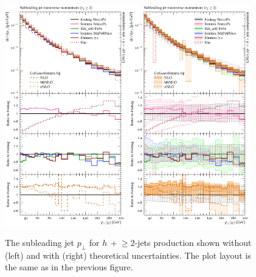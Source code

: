 \begin{figure}[t!]
  \centering
  \includegraphics[width=0.47\textwidth]{figures/hjetscomp_u_jet2_pT_incl.pdf}
  \hfill
  \includegraphics[width=0.47\textwidth]{figures/hjetscomp_jet2_pT_incl.pdf}
  \caption{\label{fig:hjetscomp:results:2obs:jet2_pt}%
    The subleading jet $p_\perp$ for $h\,+\!\ge\!2$-jets production shown
    without (left) and with (right) theoretical uncertainties. The
    plot layout is the same as in the previous figure.}
\end{figure}

